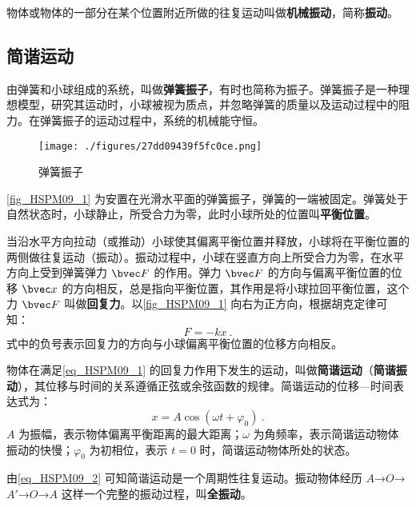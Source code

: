 

物体或物体的一部分在某个位置附近所做的往复运动叫做\textbf{机械振动}，简称\textbf{振动}。

\subsection{简谐运动}

由弹簧和小球组成的系统，叫做\textbf{弹簧振子}，有时也简称为振子。弹簧振子是一种理想模型，研究其运动时，小球被视为质点，并忽略弹簧的质量以及运动过程中的阻力。在弹簧振子的运动过程中，系统的机械能守恒。

\begin{figure}[ht]
\centering
\texttt{[image: ./figures/27dd09439f5fc0ce.png]}
\caption{弹簧振子} \label{fig_HSPM09_1}
\end{figure}

\autoref{fig_HSPM09_1} 为安置在光滑水平面的弹簧振子，弹簧的一端被固定。弹簧处于自然状态时，小球静止，所受合力为零，此时小球所处的位置叫\textbf{平衡位置}。

当沿水平方向拉动（或推动）小球使其偏离平衡位置并释放，小球将在平衡位置的两侧做往复运动（振动）。振动过程中，小球在竖直方向上所受合力为零，在水平方向上受到弹簧弹力 $\bvec F$ 的作用。弹力 $\bvec F$ 的方向与偏离平衡位置的位移 $\bvec x$ 的方向相反，总是指向平衡位置，其作用是将小球拉回平衡位置，这个力 $\bvec F$ 叫做\textbf{回复力}。以\autoref{fig_HSPM09_1} 向右为正方向，根据胡克定律可知：
\begin{equation}\label{eq_HSPM09_1}
F=-kx~.
\end{equation}
式中的负号表示回复力的方向与小球偏离平衡位置的位移方向相反。

物体在满足\autoref{eq_HSPM09_1} 的回复力作用下发生的运动，叫做\textbf{简谐运动}（\textbf{简谐振动}），其位移与时间的关系遵循正弦或余弦函数的规律。简谐运动的位移—时间表达式为：
\begin{equation}\label{eq_HSPM09_2}
x=A\cos(\omega t + \varphi_0)~.
\end{equation}
$A$ 为振幅，表示物体偏离平衡距离的最大距离；$\omega$ 为角频率，表示简谐运动物体振动的快慢；$\varphi_0$ 为初相位，表示 $t=0$ 时，简谐运动物体所处的状态。

由\autoref{eq_HSPM09_2} 可知简谐运动是一个周期性往复运动。振动物体经历 $A$→$O$→$A'$→$O$→$A$ 这样一个完整的振动过程，叫\textbf{全振动}。

